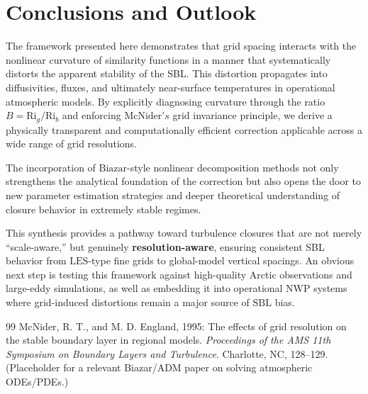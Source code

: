 \documentclass[12pt, a4paper]{article}
\begin{document}
\section{Conclusions and Outlook}

The framework presented here demonstrates that grid spacing interacts with the nonlinear curvature of similarity functions in a manner that systematically distorts the apparent stability of the SBL. This distortion propagates into diffusivities, fluxes, and ultimately near-surface temperatures in operational atmospheric models. By explicitly diagnosing curvature through the ratio $B=\text{Ri}_g/\text{Ri}_b$ and enforcing $\text{McNider}’s$ grid invariance principle, we derive a physically transparent and computationally efficient correction applicable across a wide range of grid resolutions.

The incorporation of $\text{Biazar}$-style nonlinear decomposition methods not only strengthens the analytical foundation of the correction but also opens the door to new parameter estimation strategies and deeper theoretical understanding of closure behavior in extremely stable regimes.

This synthesis provides a pathway toward turbulence closures that are not merely “scale-aware,” but genuinely \textbf{resolution-aware}, ensuring consistent SBL behavior from $\text{LES}$-type fine grids to global-model vertical spacings. An obvious next step is testing this framework against high-quality Arctic observations and large-eddy simulations, as well as embedding it into operational $\text{NWP}$ systems where grid-induced distortions remain a major source of $\text{SBL}$ bias.


\begin{thebibliography}{99}
 McNider, R. T., and M. D. England, 1995: The effects of grid resolution on the stable boundary layer in regional models. \textit{Proceedings of the AMS 11th Symposium on Boundary Layers and Turbulence}. Charlotte, NC, 128--129.
 (Placeholder for a relevant Biazar/ADM paper on solving atmospheric ODEs/PDEs.)
\end{thebibliography}
\end{document}
